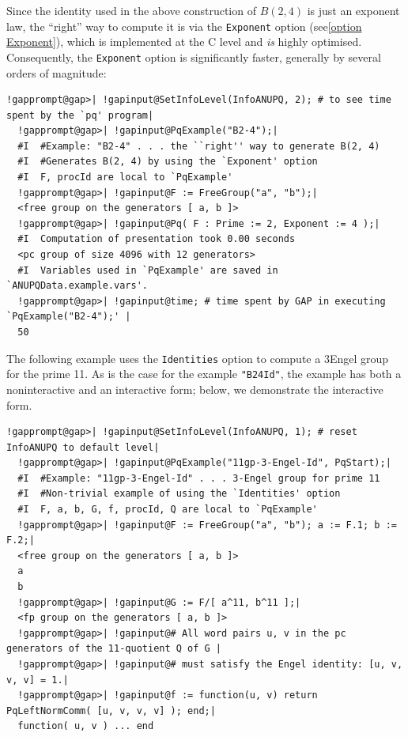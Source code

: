 \documentclass[a4paper,11pt]{report}
\begin{document}
{{ Since the identity used in the above construction of $B(2, 4)$ is just an exponent law, the ``right'' way to compute it is via the \texttt{Exponent} option (see{\nobreakspace}\ref{option Exponent}), which is implemented at the C level and \emph{is} highly optimised. Consequently, the \texttt{Exponent} option is significantly faster, generally by several orders of magnitude: 
\begin{Verbatim}[commandchars=!@|,fontsize=\small,frame=single,label=Example]
  !gapprompt@gap>| !gapinput@SetInfoLevel(InfoANUPQ, 2); # to see time spent by the `pq' program|
  !gapprompt@gap>| !gapinput@PqExample("B2-4");|
  #I  #Example: "B2-4" . . . the ``right'' way to generate B(2, 4)
  #I  #Generates B(2, 4) by using the `Exponent' option
  #I  F, procId are local to `PqExample'
  !gapprompt@gap>| !gapinput@F := FreeGroup("a", "b");|
  <free group on the generators [ a, b ]>
  !gapprompt@gap>| !gapinput@Pq( F : Prime := 2, Exponent := 4 );|
  #I  Computation of presentation took 0.00 seconds
  <pc group of size 4096 with 12 generators>
  #I  Variables used in `PqExample' are saved in `ANUPQData.example.vars'.
  !gapprompt@gap>| !gapinput@time; # time spent by GAP in executing `PqExample("B2-4");' |
  50
\end{Verbatim}
 The following example uses the \texttt{Identities} option to compute a 3\texttt{}Engel group for the prime 11. As is
the case for the example \texttt{"B2\texttt{}4\texttt{}Id"}, the example has both a non\texttt{}interactive and an interactive
form; below, we demonstrate the interactive form. 
\begin{Verbatim}[commandchars=!@|,fontsize=\small,frame=single,label=Example]
  !gapprompt@gap>| !gapinput@SetInfoLevel(InfoANUPQ, 1); # reset InfoANUPQ to default level|
  !gapprompt@gap>| !gapinput@PqExample("11gp-3-Engel-Id", PqStart);|
  #I  #Example: "11gp-3-Engel-Id" . . . 3-Engel group for prime 11
  #I  #Non-trivial example of using the `Identities' option
  #I  F, a, b, G, f, procId, Q are local to `PqExample'
  !gapprompt@gap>| !gapinput@F := FreeGroup("a", "b"); a := F.1; b := F.2;|
  <free group on the generators [ a, b ]>
  a
  b
  !gapprompt@gap>| !gapinput@G := F/[ a^11, b^11 ];|
  <fp group on the generators [ a, b ]>
  !gapprompt@gap>| !gapinput@# All word pairs u, v in the pc generators of the 11-quotient Q of G |
  !gapprompt@gap>| !gapinput@# must satisfy the Engel identity: [u, v, v, v] = 1.|
  !gapprompt@gap>| !gapinput@f := function(u, v) return PqLeftNormComm( [u, v, v, v] ); end;|
  function( u, v ) ... end

\end{Verbatim}}}
\end{document}

